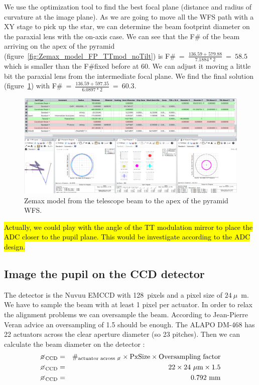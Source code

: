 \documentclass[12pt,a4paper]{article}
\begin{document}
We use the optimization tool to find the best focal plane (distance and radius of curvature at the image plane). As we are going to move all the WFS path with a XY stage to pick up the star, we can determine the beam footprint diameter on the paraxial lens with the on-axis case. We can see that the F\# of the beam arriving on the apex of the pyramid (figure~\ref{fig:Zemax_model_FP_TTmod_noTilt}) is F\#$~=~\frac{136.59+579.88}{7.1884*2}~=~58.5$ which is smaller than the F\#fixed before at 60. We can adjust it moving a little bit the paraxial lens from the intermediate focal plane. We find the final solution (figure~\ref{fig:Zemax_model_FP_ApexPyr}) with F\#$~=~\frac{136.59+597.35}{6.0897*2}~=~60.3$.\\
\begin{figure}[H]
	\begin{center}
		\includegraphics[width=\textwidth]{images/Zemax_model_FP_ApexPyr.PNG}
		\caption{Zemax model from the telescope beam to the apex of the pyramid WFS.}\label{fig:Zemax_model_FP_ApexPyr}
	\end{center}
\end{figure}

\hl{Actually, we could play with the angle of the TT modulation mirror to place the ADC closer to the pupil plane. This would be investigate according to the ADC design.}



\subsection{Image the pupil on the CCD detector}\label{subsec:4eme_partie}
The detector is the Nuvuu EMCCD with 128~pixels and a pixel size of $24~\mu$~m. We have to sample the beam with at least 1 pixel per actuator. In order to relax the alignment problems we can oversample the beam. According to Jean-Pierre Veran advice an oversampling of 1.5 should be enough. The ALAPO DM-468 has 22 actuators across the clear aperture diameter (so 23 pitches). Then we can calculate the beam diameter on the detector :
\begin{eqnarray}
	\diameter_{\text{CCD}} &= &\#_{\text{actuator across \diameter}}\times \text{PxSize}\times\text{Oversampling factor}\\
	\diameter_{\text{CCD}} &= &22\times 24~\mu\text{m}\times 1.5\\
	\diameter_{\text{CCD}} &= &0.792\,\,\text{mm}
\end{eqnarray}
\end{document}
